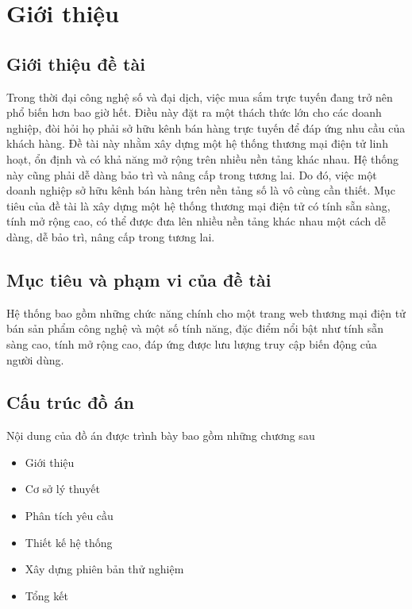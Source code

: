 \chapter{Giới thiệu}


\section{Giới thiệu đề tài}
\noindent Trong thời đại công nghệ số và đại dịch, việc mua sắm trực tuyến đang trở nên phổ biến hơn bao giờ hết. Điều này đặt ra một thách thức lớn cho các doanh nghiệp, đòi hỏi họ phải sở hữu kênh bán hàng trực tuyến để đáp ứng nhu cầu của khách hàng. Đề tài này nhằm xây dựng một hệ thống thương mại điện tử linh hoạt, ổn định và có khả năng mở rộng trên nhiều nền tảng khác nhau. Hệ thống này cũng phải dễ dàng bảo trì và nâng cấp trong tương lai. Do đó, việc một doanh nghiệp sở hữu kênh bán hàng trên nền tảng số là vô cùng cần thiết. Mục tiêu của đề tài là xây dựng một hệ thống thương mại điện tử có tính sẵn sàng, tính mở rộng cao, có thể được đưa lên nhiều nền tảng khác nhau một cách dễ dàng, dễ bảo trì, nâng cấp trong tương lai.

\section{Mục tiêu và phạm vi của đề tài}
\noindent Hệ thống bao gồm những chức năng chính cho một trang web thương mại điện tử bán sản phẩm công nghệ và một số tính năng, đặc điểm nổi bật như tính sẵn sàng cao, tính mở rộng cao, đáp ứng được lưu lượng truy cập biến động của người dùng.

\section{Cấu trúc đồ án}
\noindent Nội dung của đồ án được trình bày bao gồm những chương sau

\begin{itemize}
    \item \textbf{} Giới thiệu
    \item \textbf{} Cơ sở lý thuyết
    \item \textbf{} Phân tích yêu cầu
    \item \textbf{} Thiết kế hệ thống
    \item \textbf{} Xây dựng phiên bản thử nghiệm
    \item \textbf{} Tổng kết
\end{itemize}
